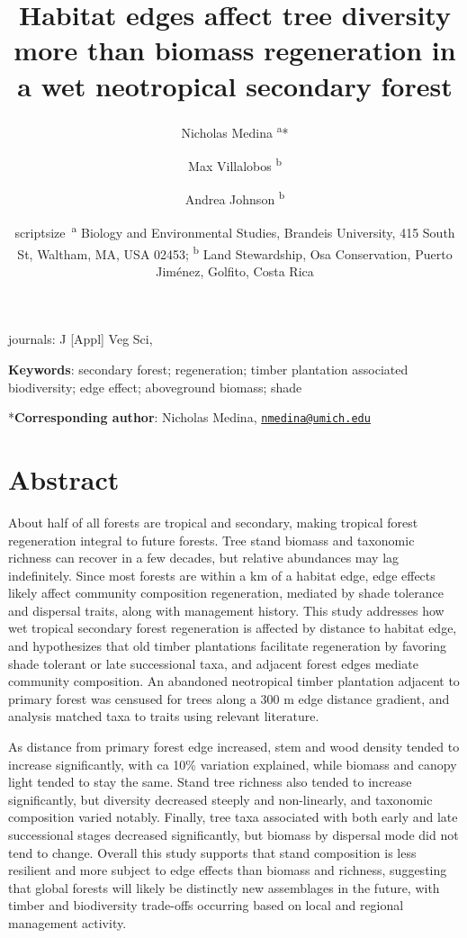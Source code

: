 \documentclass[
  12pt,
]{article}
\title{Habitat edges affect tree diversity more than biomass regeneration in a wet neotropical secondary forest}
\author{Nicholas Medina \textsuperscript{a}* \and Max Villalobos \textsuperscript{b} \and Andrea Johnson \textsuperscript{b}}
\date{scriptsize~\textsuperscript{a} Biology and Environmental Studies, Brandeis University, 415 South St, Waltham, MA, USA 02453; \textsuperscript{b} Land Stewardship, Osa Conservation, Puerto Jiménez, Golfito, Costa Rica}
\begin{document}
\maketitle

journals: J {[}Appl{]} Veg Sci,

\hfill\break
\hfill\break

\textbf{Keywords}: secondary forest; regeneration; timber plantation associated biodiversity; edge effect; aboveground biomass; shade

\hfill\break
\hfill\break

*\textbf{Corresponding author}: Nicholas Medina, \href{mailto:nmedina@umich.edu}{\nolinkurl{nmedina@umich.edu}}

\newpage

\hypertarget{abstract}{%
\section*{Abstract}\label{abstract}}

About half of all forests are tropical and secondary, making tropical forest regeneration integral to future forests.
Tree stand biomass and taxonomic richness can recover in a few decades, but relative abundances may lag indefinitely.
Since most forests are within a km of a habitat edge, edge effects likely affect community composition regeneration, mediated by shade tolerance and dispersal traits, along with management history.
This study addresses how wet tropical secondary forest regeneration is affected by distance to habitat edge, and hypothesizes that old timber plantations facilitate regeneration by favoring shade tolerant or late successional taxa, and adjacent forest edges mediate community composition.
An abandoned neotropical timber plantation adjacent to primary forest was censused for trees along a 300 m edge distance gradient, and analysis matched taxa to traits using relevant literature.

As distance from primary forest edge increased, stem and wood density tended to increase significantly, with ca 10\% variation explained, while biomass and canopy light tended to stay the same.
Stand tree richness also tended to increase significantly, but diversity decreased steeply and non-linearly, and taxonomic composition varied notably.
Finally, tree taxa associated with both early and late successional stages decreased significantly, but biomass by dispersal mode did not tend to change.
Overall this study supports that stand composition is less resilient and more subject to edge effects than biomass and richness, suggesting that global forests will likely be distinctly new assemblages in the future, with timber and biodiversity trade-offs occurring based on local and regional management activity.
\end{document}
